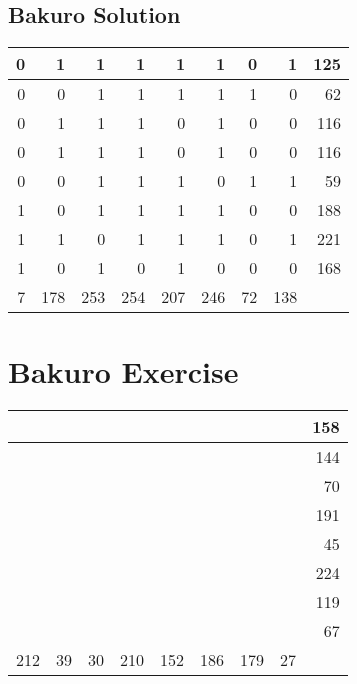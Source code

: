 \documentclass[]{article}
\begin{document}
 \subsection{Bakuro Solution} 
\begin{tabular}{rrrrrrrrr}
\hline
 0 &   1 &   1 &   1 &   1 &   1 &  0 &   1 & 125 \\ \hline
 0 &   0 &   1 &   1 &   1 &   1 &  1 &   0 &  62 \\ \hline
 0 &   1 &   1 &   1 &   0 &   1 &  0 &   0 & 116 \\ \hline
 0 &   1 &   1 &   1 &   0 &   1 &  0 &   0 & 116 \\ \hline
 0 &   0 &   1 &   1 &   1 &   0 &  1 &   1 &  59 \\ \hline
 1 &   0 &   1 &   1 &   1 &   1 &  0 &   0 & 188 \\ \hline
 1 &   1 &   0 &   1 &   1 &   1 &  0 &   1 & 221 \\ \hline
 1 &   0 &   1 &   0 &   1 &   0 &  0 &   0 & 168 \\ \hline
 7 & 178 & 253 & 254 & 207 & 246 & 72 & 138 &     \\ \hline
\hline
\end{tabular}\newpage\section{Bakuro Exercise}\begin{tabular}{rrrrrrrrr}
\hline
     &    &    &     &     &     &     &    & 158 \\ \hline
     &    &    &     &     &     &     &    & 144 \\ \hline
     &    &    &     &     &     &     &    &  70 \\ \hline
     &    &    &     &     &     &     &    & 191 \\ \hline
     &    &    &     &     &     &     &    &  45 \\ \hline
     &    &    &     &     &     &     &    & 224 \\ \hline
     &    &    &     &     &     &     &    & 119 \\ \hline
     &    &    &     &     &     &     &    &  67 \\ \hline
 212 & 39 & 30 & 210 & 152 & 186 & 179 & 27 &     \\ \hline
\hline
\end{tabular}\newpage 
\end{document}
